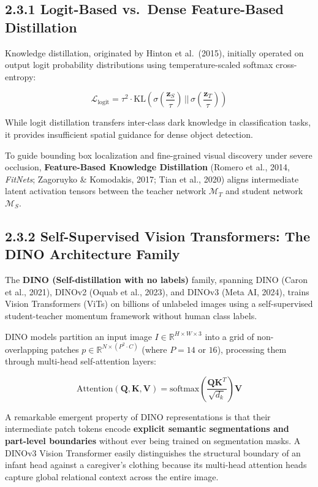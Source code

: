 \subsection{2.3.1 Logit-Based vs.~Dense Feature-Based
Distillation}\label{logit-based-vs.-dense-feature-based-distillation}

Knowledge distillation, originated by Hinton et al.~(2015), initially
operated on output logit probability distributions using
temperature-scaled softmax cross-entropy:

\[\mathcal{L}_{\text{logit}} = \tau^2 \cdot \text{KL}\left( \sigma\left(\frac{\mathbf{z}_S}{\tau}\right) \, \Big|\Big| \, \sigma\left(\frac{\mathbf{z}_T}{\tau}\right) \right)\]

While logit distillation transfers inter-class dark knowledge in
classification tasks, it provides insufficient spatial guidance for
dense object detection.

To guide bounding box localization and fine-grained visual discovery
under severe occlusion, \textbf{Feature-Based Knowledge Distillation}
(Romero et al., 2014, \emph{FitNets}; Zagoruyko \& Komodakis, 2017; Tian
et al., 2020) aligns intermediate latent activation tensors between the
teacher network \(\mathcal{M}_T\) and student network \(\mathcal{M}_S\).

\subsection{2.3.2 Self-Supervised Vision Transformers: The DINO
Architecture
Family}\label{self-supervised-vision-transformers-the-dino-architecture-family}

The \textbf{DINO (Self-distillation with no labels)} family, spanning
DINO (Caron et al., 2021), DINOv2 (Oquab et al., 2023), and DINOv3 (Meta
AI, 2024), trains Vision Transformers (ViTs) on billions of unlabeled
images using a self-supervised student-teacher momentum framework
without human class labels.

DINO models partition an input image
\(I \in \mathbb{R}^{H \times W \times 3}\) into a grid of
non-overlapping patches \(p \in \mathbb{R}^{N \times (P^2 \cdot C)}\)
(where \(P=14\) or \(16\)), processing them through multi-head
self-attention layers:

\[\text{Attention}(\mathbf{Q}, \mathbf{K}, \mathbf{V}) = \text{softmax}\left(\frac{\mathbf{Q}\mathbf{K}^T}{\sqrt{d_k}}\right)\mathbf{V}\]

A remarkable emergent property of DINO representations is that their
intermediate patch tokens encode \textbf{explicit semantic segmentations
and part-level boundaries} without ever being trained on segmentation
masks. A DINOv3 Vision Transformer easily distinguishes the structural
boundary of an infant head against a caregiver's clothing because its
multi-head attention heads capture global relational context across the
entire image.

